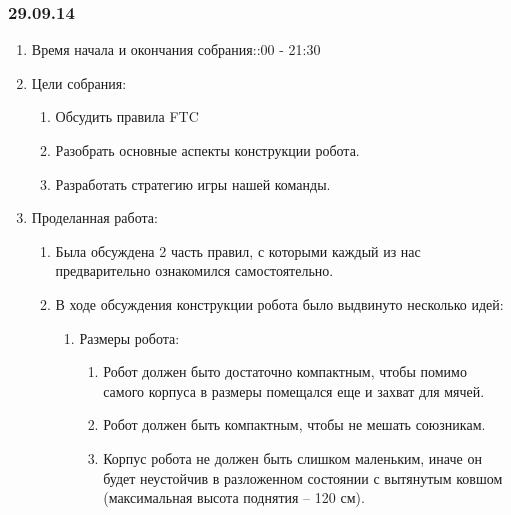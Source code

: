 	
\subsubsection{29.09.14}

\begin{enumerate}
	\item Время начала и окончания собрания::00 - 21:30
	\item Цели собрания:\newline
	\begin{enumerate}
	  \item Обсудить правила FTC \newline
	  
	  \item Разобрать основные аспекты конструкции робота.\newline
	  
      \item Разработать стратегию игры нашей команды.\newline
    \end{enumerate}
	\item Проделанная работа:\newline
	\begin{enumerate}
	  \item Была обсуждена 2 часть правил, с которыми каждый из нас предварительно ознакомился самостоятельно.\newline
	  
	  \item В ходе обсуждения конструкции робота было выдвинуто несколько идей:\newline
	  \begin{enumerate}
	    \item Размеры робота:\newline
	    \begin{enumerate}
	      \item Робот должен быто достаточно компактным, чтобы помимо самого корпуса в размеры помещался еще и захват для мячей.\newline
	      
	      \item Робот должен быть компактным, чтобы не мешать союзникам.\newline
	      
	      \item Корпус робота не должен быть слишком маленьким, иначе он будет неустойчив в разложенном состоянии с вытянутым ковшом (максимальная высота поднятия – 120 см).\newline
	      

\end{enumerate}
\end{enumerate}
\end{enumerate}
\end{enumerate}

